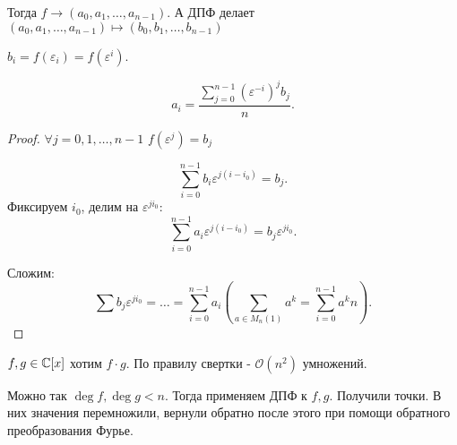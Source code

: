 Тогда  $f \to (a_0, a_1,\ldots, a_{n-1})$. А ДПФ делает $(a_0, a_1, \ldots, a_{n-1}) \mapsto (b_0, b_1, \ldots, b_{n-1})$

$b_i = f(\varepsilon_i) = f(\varepsilon^i)$.

\begin{theorem}
    \[
        a_i = \frac{\sum_{j=0}^{n-1}(\varepsilon^{-i})^j b_j}{n}
    .\] 
\end{theorem}
\begin{proof}
    $\forall j = 0, 1, \ldots, n - 1$ $f(\varepsilon^j) = b_j$

    \[\sum_{i = 0}^{n-1} b_i \varepsilon^{j(i-i_0)} = b_j.\] 
    Фиксируем $i_0$, делим на  $\varepsilon^{ji_0}$:
    \[
    \sum_{i=0}^{n-1} a_i \varepsilon^{j(i-i_0)} = b_j \varepsilon^{ji_0}
    .\] 

    Сложим:
    \[
    \sum b_j \varepsilon^{ji_0} = \ldots = \sum_{i=0}^{n-1}a_i\left(\sum_{a \in M_n(1)} a^k = \sum_{i=0}^{n-1} a^k n \right)
    .\] 
\end{proof}

$f, g \in \mathbb{C}[x]$ хотим  $f\cdot g$. По правилу свертки -  $\mathcal{O}(n^2)$ умножений.

Можно так  $\deg f, \deg g < n$. Тогда применяем ДПФ к  $f, g$. Получили точки. В них значения перемножили, вернули обратно после этого при помощи обратного преобразования Фурье.


